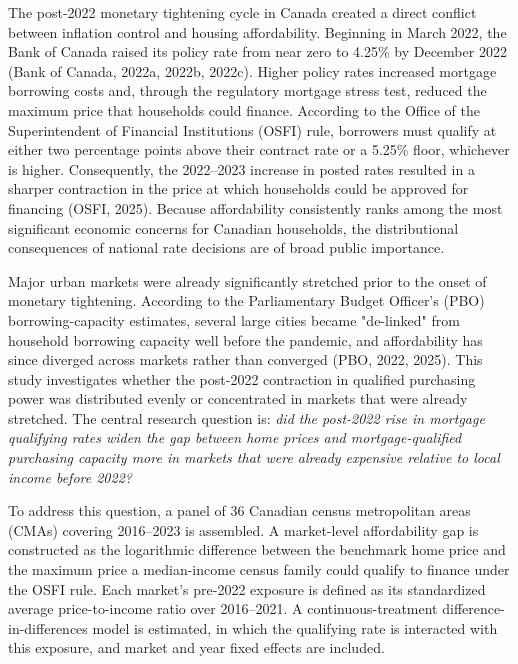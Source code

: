 \documentclass[12pt]{article}
\begin{document}
The post-2022 monetary tightening cycle in Canada created a direct conflict between inflation control and housing affordability. Beginning in March 2022, the Bank of Canada raised its policy rate from near zero to 4.25\% by December 2022 (Bank of Canada, 2022a, 2022b, 2022c). Higher policy rates increased mortgage borrowing costs and, through the regulatory mortgage stress test, reduced the maximum price that households could finance. According to the Office of the Superintendent of Financial Institutions (OSFI) rule, borrowers must qualify at either two percentage points above their contract rate or a 5.25\% floor, whichever is higher. Consequently, the 2022–2023 increase in posted rates resulted in a sharper contraction in the price at which households could be approved for financing (OSFI, 2025). Because affordability consistently ranks among the most significant economic concerns for Canadian households, the distributional consequences of national rate decisions are of broad public importance.

Major urban markets were already significantly stretched prior to the onset of monetary tightening. According to the Parliamentary Budget Officer's (PBO) borrowing-capacity estimates, several large cities became "de-linked" from household borrowing capacity well before the pandemic, and affordability has since diverged across markets rather than converged (PBO, 2022, 2025). This study investigates whether the post-2022 contraction in qualified purchasing power was distributed evenly or concentrated in markets that were already stretched. The central research question is: \emph{did the post-2022 rise in mortgage qualifying rates widen the gap between home prices and mortgage-qualified purchasing capacity more in markets that were already expensive relative to local income before 2022?}

To address this question, a panel of 36 Canadian census metropolitan areas (CMAs) covering 2016–2023 is assembled. A market-level affordability gap is constructed as the logarithmic difference between the benchmark home price and the maximum price a median-income census family could qualify to finance under the OSFI rule. Each market's pre-2022 exposure is defined as its standardized average price-to-income ratio over 2016–2021. A continuous-treatment difference-in-differences model is estimated, in which the qualifying rate is interacted with this exposure, and market and year fixed effects are included.
\end{document}
